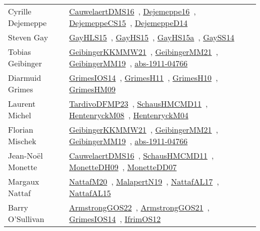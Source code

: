 {\begin{longtable}{p{4cm}p{20cm}}
Cyrille Dejemeppe & \href{works/CauwelaertDMS16.pdf}{CauwelaertDMS16}~\cite{CauwelaertDMS16}, \href{}{Dejemeppe16}~\cite{Dejemeppe16}, \href{works/DejemeppeCS15.pdf}{DejemeppeCS15}~\cite{DejemeppeCS15}, \href{works/DejemeppeD14.pdf}{DejemeppeD14}~\cite{DejemeppeD14}\\
Steven Gay & \href{works/GayHLS15.pdf}{GayHLS15}~\cite{GayHLS15}, \href{works/GayHS15.pdf}{GayHS15}~\cite{GayHS15}, \href{works/GayHS15a.pdf}{GayHS15a}~\cite{GayHS15a}, \href{works/GaySS14.pdf}{GaySS14}~\cite{GaySS14}\\
Tobias Geibinger & \href{works/GeibingerKKMMW21.pdf}{GeibingerKKMMW21}~\cite{GeibingerKKMMW21}, \href{works/GeibingerMM21.pdf}{GeibingerMM21}~\cite{GeibingerMM21}, \href{works/GeibingerMM19.pdf}{GeibingerMM19}~\cite{GeibingerMM19}, \href{works/abs-1911-04766.pdf}{abs-1911-04766}~\cite{abs-1911-04766}\\
Diarmuid Grimes & \href{works/GrimesIOS14.pdf}{GrimesIOS14}~\cite{GrimesIOS14}, \href{works/GrimesH11.pdf}{GrimesH11}~\cite{GrimesH11}, \href{works/GrimesH10.pdf}{GrimesH10}~\cite{GrimesH10}, \href{works/GrimesHM09.pdf}{GrimesHM09}~\cite{GrimesHM09}\\
Laurent Michel & \href{works/TardivoDFMP23.pdf}{TardivoDFMP23}~\cite{TardivoDFMP23}, \href{works/SchausHMCMD11.pdf}{SchausHMCMD11}~\cite{SchausHMCMD11}, \href{works/HentenryckM08.pdf}{HentenryckM08}~\cite{HentenryckM08}, \href{works/HentenryckM04.pdf}{HentenryckM04}~\cite{HentenryckM04}\\
Florian Mischek & \href{works/GeibingerKKMMW21.pdf}{GeibingerKKMMW21}~\cite{GeibingerKKMMW21}, \href{works/GeibingerMM21.pdf}{GeibingerMM21}~\cite{GeibingerMM21}, \href{works/GeibingerMM19.pdf}{GeibingerMM19}~\cite{GeibingerMM19}, \href{works/abs-1911-04766.pdf}{abs-1911-04766}~\cite{abs-1911-04766}\\
Jean{-}No{\"{e}}l Monette & \href{works/CauwelaertDMS16.pdf}{CauwelaertDMS16}~\cite{CauwelaertDMS16}, \href{works/SchausHMCMD11.pdf}{SchausHMCMD11}~\cite{SchausHMCMD11}, \href{works/MonetteDH09.pdf}{MonetteDH09}~\cite{MonetteDH09}, \href{works/MonetteDD07.pdf}{MonetteDD07}~\cite{MonetteDD07}\\
Margaux Nattaf & \href{works/NattafM20.pdf}{NattafM20}~\cite{NattafM20}, \href{works/MalapertN19.pdf}{MalapertN19}~\cite{MalapertN19}, \href{works/NattafAL17.pdf}{NattafAL17}~\cite{NattafAL17}, \href{works/NattafAL15.pdf}{NattafAL15}~\cite{NattafAL15}\\
Barry O'Sullivan & \href{works/ArmstrongGOS22.pdf}{ArmstrongGOS22}~\cite{ArmstrongGOS22}, \href{works/ArmstrongGOS21.pdf}{ArmstrongGOS21}~\cite{ArmstrongGOS21}, \href{works/GrimesIOS14.pdf}{GrimesIOS14}~\cite{GrimesIOS14}, \href{works/IfrimOS12.pdf}{IfrimOS12}~\cite{IfrimOS12}\\

\end{longtable}}
